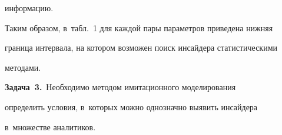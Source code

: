информацию. 


  


  





  


  Таким образом, в~табл.~1 для каждой пары параметров приведена нижняя 


граница интервала, на котором возможен поиск инсайдера статистическими 


методами. 


  


  \smallskip


  


  \noindent


  \textbf{Задача~3.}\ Необходимо методом имитационного моделирования 


определить условия, в~которых можно однозначно выявить инсайдера 


в~множестве аналитиков.





